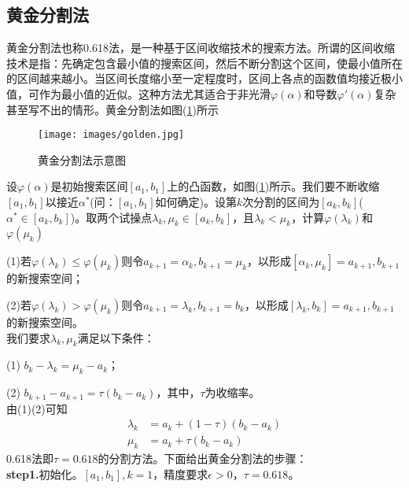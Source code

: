     \subsection{黄金分割法}
        \par
        黄金分割法也称0.618法，是一种基于区间收缩技术的搜索方法。所谓的区间收缩技术是指：先确定包含最小值的搜索区间，然后不断分割这个区间，使最小值所在的区间越来越小。当区间长度缩小至一定程度时，区间上各点的函数值均接近极小值，可作为最小值的近似。这种方法尤其适合于非光滑$\varphi(\alpha)$和导数${\varphi}{'}(\alpha)$复杂甚至写不出的情形。黄金分割法如图(\ref{fig:黄金分割法示意图})所示
        \begin{figure}[H]
        \centering
        \texttt{[image: images/golden.jpg]}
        \caption{黄金分割法示意图}
        \label{fig:黄金分割法示意图}
        \end{figure}
        \par
        设$\varphi(\alpha)$是初始搜索区间$[a_1,b_1]$上的凸函数，如图(\ref{fig:黄金分割法示意图})所示。我们要不断收缩$[a_1,b_1]$以接近$\alpha ^*$(问：$[a_1,b_1]$如何确定)。设第$k$次分割的区间为$[a_k,b_k]$($\alpha^*\in [a_k,b_k]$)。取两个试操点$\lambda_k,\mu_k\in [a_k,b_k]$，且${\lambda}_k<{\mu}_k$，计算$\varphi({\lambda}_k)$和$\varphi({\mu}_k)$
        \par
        (1)若$\varphi({\lambda}_k) \le \varphi({\mu}_k)$则令$a_{k+1}={\alpha}_k,b_{k+1}={\mu}_k$，以形成$[{\alpha}_k,{\mu}_k]=a_{k+1},b_{k+1}$的新搜索空间；
        \par
        (2)若$\varphi({\lambda}_k) > \varphi({\mu}_k)$则令$a_{k+1}={\lambda}_k,b_{k+1}=b_k$，以形成$[{\lambda}_k,b_k]=a_{k+1},b_{k+1}$的新搜索空间。\\
        我们要求${\lambda}_k,{\mu}_k$满足以下条件：\par
        (1) $b_k-{\lambda}_k={\mu}_k-a_k$；\par
        (2) $b_{k+1}-a_{k+1}=\tau (b_k-a_k)$，其中，$\tau $为收缩率。\\
        由(1)(2)可知
        \begin{align*}
        {\lambda}_k & =a_k+(1-\tau)(b_k-a_k)\\
        {\mu}_k & =a_k+\tau(b_k-a_k)
        \end{align*}
        0.618法即$\tau=0.618$的分割方法。下面给出黄金分割法的步骤：\\
        \textbf{step1.}初始化。$[a_1,b_1],k=1$，精度要求$\epsilon>0$，$\tau=0.618$。\\
